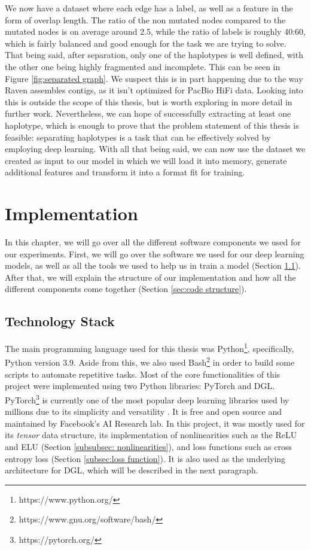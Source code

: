 \documentclass[times, utf8, diplomski, english]{fer_eng}
\begin{document}
We now have a dataset where each edge has a label, as well as a feature in the form of overlap length. The ratio of the non mutated nodes compared to the mutated nodes is on average around 2.5, while the ratio of labels is roughly 40:60, which is fairly balanced and good enough for the task we are trying to solve. That being said, after separation, only one of the haplotypes is well defined, with the other one being highly fragmented and incomplete. This can be seen in Figure \ref{fig:separated graph}. We suspect this is in part happening due to the way Raven assembles contigs, as it isn't optimized for PacBio HiFi data. Looking into this is outside the scope of this thesis, but is worth exploring in more detail in further work. Nevertheless, we can hope of successfully extracting at least one haplotype, which is enough to prove that the problem statement of this thesis is feasible: separating haplotypes is a task that can be effectively solved by employing deep learning. With all that being said, we can now use the dataset we created as input to our model in which we will load it into memory, generate additional features and transform it into a format fit for training.

\chapter{Implementation}
\label{ch:implementation}

In this chapter, we will go over all the different software components we used for our experiments. First, we will go over the software we used for our deep learning models, as well as all the tools we used to help us in train a model (Section \ref{sec:technology stack}). After that, we will explain the structure of our implementation and how all the different components come together (Section \ref{sec:code structure}).

\section{Technology Stack}
\label{sec:technology stack}

The main programming language used for this thesis was Python\footnote{https://www.python.org/}, specifically, Python version 3.9. Aside from this, we also used Bash\footnote{https://www.gnu.org/software/bash/} in order to build some scripts to automate repetitive tasks. Most of the core functionalities of this project were implemented using two Python libraries: PyTorch and DGL. PyTorch\footnote{https://pytorch.org/} is currently one of the most popular deep learning libraries used by millions due to its simplicity and versatility \cite{popular_ml}. It is free and open source and maintained by Facebook's AI Research lab. In this project, it was mostly used for its \textit{tensor} data structure, its implementation of nonlinearities such as the ReLU and ELU (Section \ref{subsubsec: nonlinearities}), and loss functions such as cross entropy loss (Section \ref{subsec:loss function}). It is also used as the underlying architecture for DGL, which will be described in the next paragraph.
\end{document}

